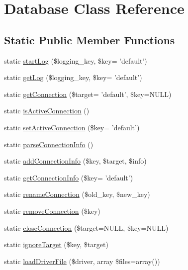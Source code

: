 \hypertarget{classDatabase}{
\section{Database Class Reference}
\label{classDatabase}
}
\subsection*{Static Public Member Functions}
\begin{DoxyCompactItemize}
\item 
static \hyperlink{classDatabase_a4785b9bc2918dacdcc861b261513715d}{startLog} (\$logging\_\-key, \$key= 'default')
\item 
static \hyperlink{classDatabase_a0a11c88ba9539bff6131c8fae25e504d}{getLog} (\$logging\_\-key, \$key= 'default')
\item 
static \hyperlink{classDatabase_aa8e4f73dfd6ad94a166a6fa3e44351cf}{getConnection} (\$target= 'default', \$key=NULL)
\item 
static \hyperlink{classDatabase_ac67e96fee55a1ec6820a6678428d7b91}{isActiveConnection} ()
\item 
static \hyperlink{classDatabase_afee50f4c59d97ccdcc6c4088adf7bc4e}{setActiveConnection} (\$key= 'default')
\item 
static \hyperlink{classDatabase_a65d7ffd8cc0b81ead0e2a6ca0836343c}{parseConnectionInfo} ()
\item 
static \hyperlink{classDatabase_a8b2462c18a8a4fea7c350e1123d3c6e7}{addConnectionInfo} (\$key, \$target, \$info)
\item 
static \hyperlink{classDatabase_a4ddbb695ae89b6180e0390c231b70ea5}{getConnectionInfo} (\$key= 'default')
\item 
static \hyperlink{classDatabase_aa0401fcf5edecc7f81cf32251aeee593}{renameConnection} (\$old\_\-key, \$new\_\-key)
\item 
static \hyperlink{classDatabase_a5c2f9463e38304080a2d555a588010ef}{removeConnection} (\$key)
\item 
static \hyperlink{classDatabase_a1e6a2484bc6ea4ac8ce820dd12baaa5b}{closeConnection} (\$target=NULL, \$key=NULL)
\item 
static \hyperlink{classDatabase_a574ba08b096e4051b221166fc0bc4d21}{ignoreTarget} (\$key, \$target)
\item 
static \hyperlink{classDatabase_a25fe33ffa87aaf80ff680e356230d9e2}{loadDriverFile} (\$driver, array \$files=array())
\end{DoxyCompactItemize}

